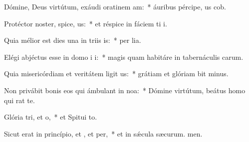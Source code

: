 \item Dómine, Deus virtútum, exáudi oratinem am:~* áuribus pércipe, us cob.
\item Protéctor noster, spice, us:~* et réspice in fáciem ti i.
\item Quia mélior est dies una in triis is:~* per lia.
\item Elégi abjéctus esse in domo i i:~* magis quam habitáre in tabernáculis carum.
\item Quia misericórdiam et veritátem ligit us:~* grátiam et glóriam bit minus.
\item Non privábit bonis eos qui ámbulant in noa:~* Dómine virtútum, beátus homo qui rat  te.
\item Glória tri, et o,~* et Spitui to.
\item Sicut erat in princípio, et , et per,~* et in sǽcula sæcurum. men.
